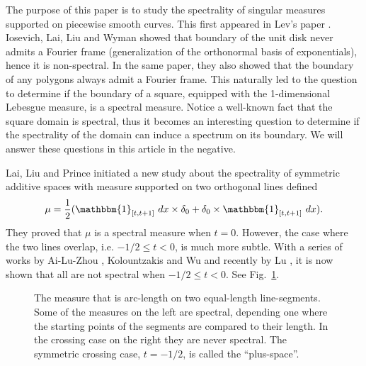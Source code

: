 \documentclass[12pt,a4paper,oneside]{amsart}
\theoremstyle{definition}
\newcommand{\one}{{\mathbbm{1}}}
\begin{document}
The purpose of this paper is to study the spectrality of singular measures supported on piecewise smooth curves.  This first appeared in Lev's paper \cite{lev2018fourier}.  Iosevich, Lai, Liu and Wyman showed that boundary of the unit disk {never admits a Fourier frame  (generalization of the orthonormal basis of exponentials), hence it is non-spectral}\cite{iosevich2022fourier}. {In the same paper}, they also showed that the boundary of any polygons always admit a Fourier frame. This naturally {led to the} question to determine if the boundary of a square, equipped with the 1-dimensional Lebesgue measure, is a spectral measure. {Notice a well-known fact that the square domain is spectral, thus it becomes an interesting question to determine if the spectrality of the domain can induce a spectrum on its boundary. We will answer these questions in this article in the negative.} 

Lai, Liu and Prince \cite{lai2021spectral} initiated a new study about the spectrality of symmetric additive spaces with measure supported on two orthogonal lines defined 
\begin{equation}\label{eq-symmetric-measure}
\mu = \frac12 (\one_{[t,t+1]}~dx\times \delta_0+ \delta_0\times \one_{[t,t+1]}~dx).    
\end{equation}
They proved that $\mu$ is a spectral measure when $t = 0$. However, the case where the two lines overlap, i.e. $-1/2\le t<0$, is much more subtle. With a series of work{s} by Ai-Lu-Zhou \cite{ai2023spectrality}, Kolountzakis and Wu \cite{kolountzakis2025spectralitymeasureconsistingline} and recently by Lu \cite{lu2025frameboundspectralgap}, it is now shown that all are not spectral when $-1/2\le t<0$. See Fig.\ \ref{fig:sticks}.

\begin{figure}[h]
\ifdefined\SMART\resizebox{4cm}{!}{}\else

\fi
\caption{The measure that is arc-length on two equal-length line-segments. Some of the measures on the left are spectral, depending one where the starting points of the segments are compared to their length. In the crossing case on the right they are never spectral. The symmetric crossing case, $t=-1/2$, is called the ``plus-space''.}\label{fig:sticks}
\end{figure}
\end{document}
